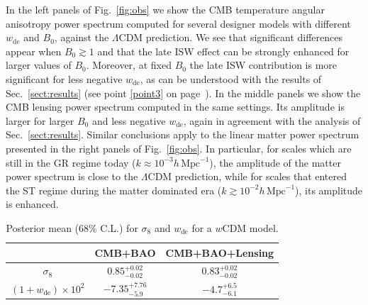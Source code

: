 \documentclass[nofootinbib,a4paper,aps,prd,10pt,superscriptaddress,reprint,showkeys,showpacs]{revtex4-1}
\newcommand{\qsubrm}[2]{{#1}_{\scriptscriptstyle{\textrm{#2}}}}
\begin{document}
In the left panels of Fig.~\ref{fig:obs} we show the CMB temperature angular anisotropy power spectrum computed for 
several designer models with different $\qsubrm{w}{de}$ and $\qsubrm{B}{0}$, against the $\Lambda$CDM prediction. 
We see that significant differences appear when $\qsubrm{B}{0}\gtrsim 1$ and that the late ISW effect can be strongly 
enhanced for larger values of $\qsubrm{B}{0}$. Moreover, at fixed $\qsubrm{B}{0}$ the late ISW contribution is more 
significant for less negative $\qsubrm{w}{de}$, as can be understood with the results of Sec.~\ref{sect:results} 
(see point \ref{point3} on page~\pageref{point3}). In the middle panels we show the CMB lensing power spectrum computed 
in the same settings. Its amplitude is larger for larger $\qsubrm{B}{0}$ and less negative $\qsubrm{w}{de}$, again in 
agreement with the analysis of Sec.~\ref{sect:results}. Similar conclusions apply to the linear matter power 
spectrum presented in the right panels of Fig.~\ref{fig:obs}. In particular, for scales which are still in the GR 
regime today ($k\approx 10^{-3} h\,\mathrm{Mpc}^{-1}$), the amplitude of the matter power spectrum is close to the 
$\Lambda$CDM prediction, while for scales that entered the ST regime during the matter dominated era 
($k\gtrsim 10^{-2} h\,\mathrm{Mpc}^{-1}$), its amplitude is enhanced.

\begin{table}[!th]
 \begin{center}
  \renewcommand*{\arraystretch}{1.2}
  \caption{\label{tab:con3} Posterior mean (68\% C.L.) for $\qsubrm{\sigma}{8}$ and $\qsubrm{w}{de}$ for a $w$CDM 
  model.}
  \begin{ruledtabular}
   \begin{tabular}{ccc}
    & CMB+BAO & CMB+BAO+Lensing \\
    \hline
    $\qsubrm{\sigma}{8}$     & $0.85^{+0.02}_{-0.02}$ & $0.83^{+0.02}_{-0.02}$\\
    
    $(1+\qsubrm{w}{de})\times10^2$         & $-7.35^{+7.76}_{-5.9}$ & $-4.7^{+6.5}_{-6.1}$ \\
   \end{tabular}
  \end{ruledtabular}
 \end{center}
\end{table}
   
\vspace{0.5cm}
\end{document}

